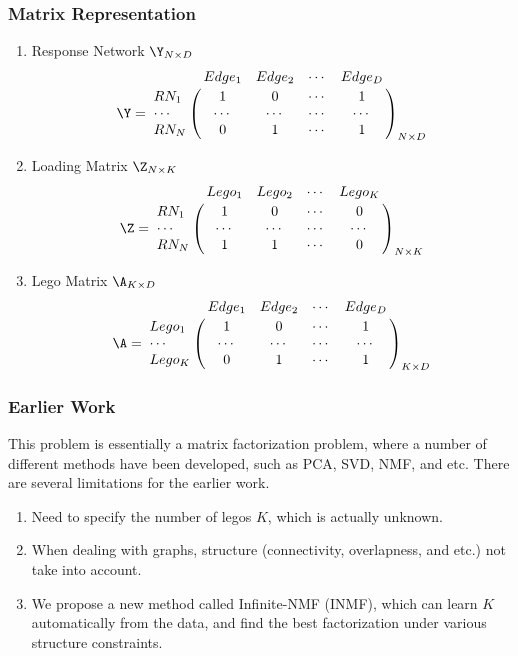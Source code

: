 \documentclass{beamer}
\begin{document}
\begin{frame}
\frametitle{Matrix Representation}
\fontsize{6pt}{7.2}\selectfont
\begin{enumerate}
	\item Response Network $\Y_{N \times D}$
$$\Y = \bordermatrix{~ & Edge_1 & Edge_2 & \cdots & Edge_D\cr
                  RN_1 & 1 & 0 & \cdots & 1\cr
                  \cdots & \cdots & \cdots & \cdots & \cdots \cr
                  RN_N & 0 & 1 & \cdots & 1 \cr}_{N \times D}$$	
	\item Loading Matrix $\Z_{N \times K}$
$$\Z = \bordermatrix{~ & Lego_1 & Lego_2 & \cdots & Lego_K\cr
                  RN_1 & 1 & 0 & \cdots & 0\cr
                  \cdots & \cdots & \cdots & \cdots & \cdots \cr
                  RN_N & 1 & 1 & \cdots & 0 \cr}_{N \times K}$$	
	\item Lego Matrix $\A_{K \times D}$
$$\A = \bordermatrix{~ & Edge_1 & Edge_2 & \cdots & Edge_D\cr
                  Lego_1 & 1 & 0 & \cdots & 1\cr
                  \cdots & \cdots & \cdots & \cdots & \cdots \cr
                  Lego_K & 0 & 1 & \cdots & 1 \cr}_{K \times D}$$	
\end{enumerate}	

\end{frame}

\begin{frame}
\frametitle{Earlier Work}
This problem is essentially a matrix factorization problem, where a number of different methods have been developed, such as PCA, SVD, NMF, and etc. There are several limitations for the earlier work.
\begin{enumerate}
	\item Need to specify the number of legos $K$, which is actually unknown.
	\item When dealing with graphs, structure (connectivity, overlapness, and etc.) not take into account.
	\item We propose a new method called Infinite-NMF (INMF), which can learn $K$ automatically from the data, and find the best factorization under various structure constraints.
\end{enumerate}

\end{frame}
\end{document}
